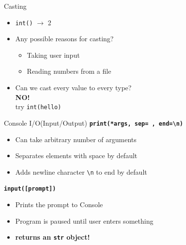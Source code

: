         \begin{frame}{Casting}
            \LARGE
            \begin{itemize}
                \item \texttt{int(\textquotesingle)} $\to$ 2
                \pause
                \item Any possible reasons for casting?
                \pause
                \begin{itemize}
                    \LARGE
                    \item Taking user input\\
                    \item Reading numbers from a file\\
                \end{itemize}
                \pause
                \item Can we cast every value to every type?
                \\
                \pause
                \textbf{NO!} 
                \\try \texttt{int(\textquotesingle hello\textquotesingle)}
            \end{itemize}
        \end{frame}

        \begin{frame}{Console I/O(Input/Output)}
            \huge
            \textbf{\texttt{print(*args, sep=\textquotesingle \ \textquotesingle, end=\textquotesingle \textbackslash n\textquotesingle )}}
            \begin{itemize}
                \LARGE
                \item Can take arbitrary number of arguments
                \item Separates elements with space by default
                \item Adds newline character \texttt{\textquotesingle \textbackslash n\textquotesingle} to end by default
            \end{itemize}
            
            \textbf{\texttt{input([prompt])}}
            \begin{itemize}
                \LARGE
                \item Prints the prompt to Console
                \item Program is paused until user enters something
                \item \textbf{returns an \texttt{str} object!} 
            \end{itemize}
        \end{frame}

